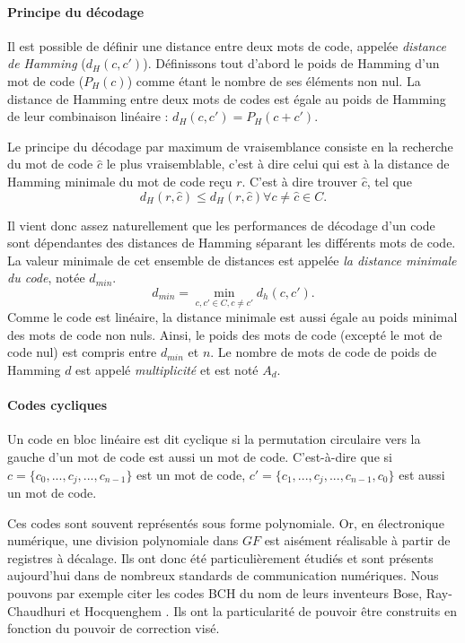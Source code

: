 \paragraph*{Principe du décodage}
Il est possible de définir une distance entre deux mots de code, appelée \emph{distance de Hamming} ($d_H(c, c')$). 
Définissons tout d'abord le poids de Hamming d'un mot de code ($P_H(c)$) comme étant le nombre de ses éléments non nul. 
La distance de Hamming entre deux mots de codes est égale au poids de Hamming de leur combinaison linéaire : 
$d_H(c, c') = P_H(c+c')$.

Le principe du décodage par maximum de vraisemblance consiste en la recherche du mot de code $\hat{c}$ le plus 
vraisemblable, c'est à dire celui qui est à la distance de Hamming minimale du mot de code reçu $r$. C'est à dire trouver 
$\hat{c}$, tel que \[d_H(r,\hat{c}) \leq d_H(r,\hat{c}) \forall c \neq \hat{c} \in C.\]

Il vient donc assez naturellement que les performances de décodage d'un code sont dépendantes des distances de Hamming 
séparant les différents mots de code. La valeur minimale de cet ensemble de distances est appelée \emph{la distance minimale du code}, 
notée $d_{min}$. \[d_{min}=\min\limits_{c,c'\in C, c\ne c'}d_h(c, c').\] Comme le code est linéaire, la distance minimale 
est aussi égale au poids minimal des mots de code non nuls. Ainsi, le poids des mots de code (excepté le mot 
de code nul) est compris entre $d_{min}$ et $n$. Le nombre de mots de code de poids de Hamming $d$ est appelé 
\emph{multiplicité} et est noté $A_d$.

\paragraph*{Codes cycliques} Un code en bloc linéaire est dit cyclique si la permutation circulaire vers la 
gauche d'un mot de code est aussi un mot de code. C'est-à-dire que si $c = \{c_0, ..., c_j, ..., c_{n-1}\}$ est un mot 
de code, $c' = \{c_1, ..., c_j, ..., c_{n-1}, c_0\}$ est aussi un mot de code.

Ces codes sont souvent représentés sous forme polynomiale. Or, en électronique numérique, une division polynomiale dans $GF$ est aisément 
réalisable à partir de registres à décalage. Ils ont donc été particulièrement étudiés et sont présents aujourd'hui dans 
de nombreux standards de communication numériques. Nous pouvons par exemple citer les codes BCH du nom de leurs inventeurs Bose, 
Ray-Chaudhuri et Hocquenghem \cite{bose1960class}. Ils ont la particularité de pouvoir être construits en fonction du pouvoir 
de correction visé.

